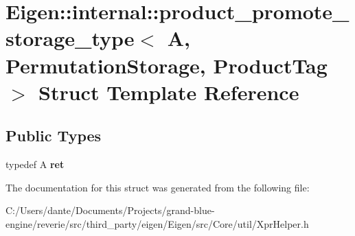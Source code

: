 \hypertarget{struct_eigen_1_1internal_1_1product__promote__storage__type_3_01_a_00_01_permutation_storage_00_01_product_tag_01_4}{}\section{Eigen\+::internal\+::product\+\_\+promote\+\_\+storage\+\_\+type$<$ A, Permutation\+Storage, Product\+Tag $>$ Struct Template Reference}
\label{struct_eigen_1_1internal_1_1product__promote__storage__type_3_01_a_00_01_permutation_storage_00_01_product_tag_01_4}
\subsection*{Public Types}
\begin{DoxyCompactItemize}
\item 
\mbox{\label{struct_eigen_1_1internal_1_1product__promote__storage__type_3_01_a_00_01_permutation_storage_00_01_product_tag_01_4_a01c2d9f17207b5b2a3bf0ed9826523a6}} 
typedef A {\bfseries ret}
\end{DoxyCompactItemize}


The documentation for this struct was generated from the following file\+:\begin{DoxyCompactItemize}
\item 
C\+:/\+Users/dante/\+Documents/\+Projects/grand-\/blue-\/engine/reverie/src/third\+\_\+party/eigen/\+Eigen/src/\+Core/util/Xpr\+Helper.\+h\end{DoxyCompactItemize}
